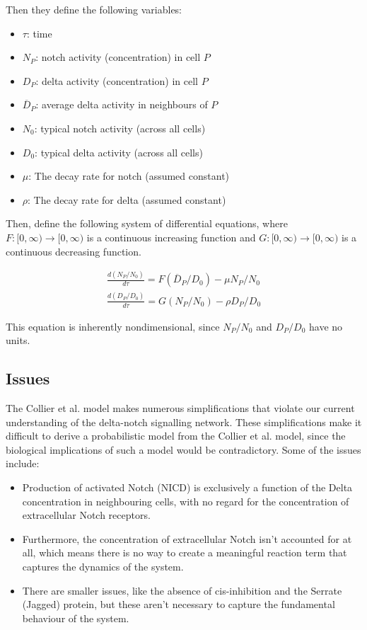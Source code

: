 \documentclass{article}
\begin{document}
\begin{flushleft}
Then they define the following variables:

\begin{itemize}
  \item $\tau$: time
  \item $N_{P}$: notch activity (concentration) in cell $P$
  \item $D_{P}$: delta activity (concentration) in cell $P$
  \item $\overline{D}_{P}$: average delta activity in neighbours of $P$
  \item $N_{0}$: typical notch activity (across all cells)
  \item $D_{0}$: typical delta activity (across all cells)
  \item $\mu$: The decay rate for notch (assumed constant)
  \item $\rho$: The decay rate for delta (assumed constant)
\end{itemize}

Then, define the following system of differential equations, where $F:[0, \infty) \rightarrow [0, \infty)$ is a continuous increasing function and $G: [0, \infty)\rightarrow [0, \infty)$ is a continuous decreasing function.

$$
\begin{aligned}
  \frac{d(N_{P} / N_{0})}{d\tau} = F(\overline{D}_{P} / D_{0}) - \mu N_{P} / N_{0} \\[5pt]
  \frac{d(D_{P} / D_{0})}{d\tau} = G(N_{P} / N_{0}) - \rho D_{P} / D_{0}
\end{aligned}
$$

This equation is inherently nondimensional, since $N_{P} / N_{0}$ and $D_{P} / D_{0}$ have no units.

\subsection{Issues}

The Collier et al. model makes numerous simplifications that violate our current understanding of the delta-notch signalling network. These simplifications make it difficult to derive a probabilistic model from the Collier et al. model, since the biological implications of such a model would be contradictory. Some of the issues include:

\begin{itemize}
  \item Production of activated Notch (NICD) is exclusively a function of the Delta concentration in neighbouring cells, with no regard for the concentration of extracellular Notch receptors.
  \item Furthermore, the concentration of extracellular Notch isn't accounted for at all, which means there is no way to create a meaningful reaction term that captures the dynamics of the system.
  \item There are smaller issues, like the absence of cis-inhibition and the Serrate (Jagged) protein, but these aren't necessary to capture the fundamental behaviour of the system.
\end{itemize}


\end{flushleft}
\end{document}
